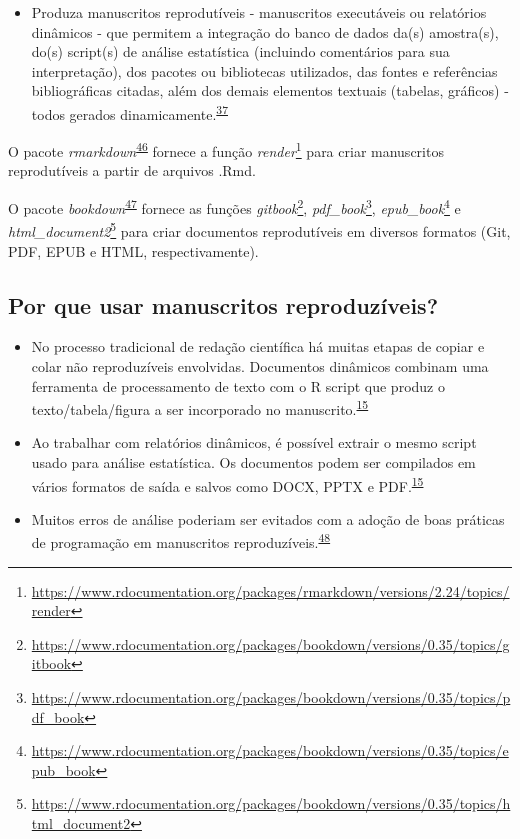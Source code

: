 \documentclass[
  a4paper,
]{book}
\providecommand{\tightlist}{%
  \setlength{\itemsep}{0pt}\setlength{\parskip}{0pt}}
\renewcommand{\href}[2]{#2\footnote{\url{#1}}}
\newenvironment{infobox}[1]
  {
  \begin{itemize}
  \renewcommand{\labelitemi}{
    \raisebox{-.7\height}[0pt][0pt]{
      {\setkeys{Gin}{width=3em,keepaspectratio}
        \texttt{[image: \#1]}}
    }
  }
  \setlength{\fboxsep}{1em}
  \begin{blackbox}
  \item
  }
  {
  \end{blackbox}
  \end{itemize}
  }
\begin{document}
\begin{itemize}
\tightlist
\item
  Produza manuscritos reprodutíveis - manuscritos executáveis ou relatórios dinâmicos - que permitem a integração do banco de dados da(s) amostra(s), do(s) script(s) de análise estatística (incluindo comentários para sua interpretação), dos pacotes ou bibliotecas utilizados, das fontes e referências bibliográficas citadas, além dos demais elementos textuais (tabelas, gráficos) - todos gerados dinamicamente.\textsuperscript{\protect\hyperlink{ref-hinsen2011}{37}}
\end{itemize}

\begin{infobox}{images/Rlogo}
O pacote \emph{rmarkdown}\textsuperscript{\protect\hyperlink{ref-rmarkdown}{46}} fornece a função \href{https://www.rdocumentation.org/packages/rmarkdown/versions/2.24/topics/render}{\emph{render}} para criar manuscritos reprodutíveis a partir de arquivos .Rmd.

\end{infobox}

\begin{infobox}{images/Rlogo}
O pacote \emph{bookdown}\textsuperscript{\protect\hyperlink{ref-bookdown-2}{47}} fornece as funções \href{https://www.rdocumentation.org/packages/bookdown/versions/0.35/topics/gitbook}{\emph{gitbook}}, \href{https://www.rdocumentation.org/packages/bookdown/versions/0.35/topics/pdf_book}{\emph{pdf\_book}}, \href{https://www.rdocumentation.org/packages/bookdown/versions/0.35/topics/epub_book}{\emph{epub\_book}} e \href{https://www.rdocumentation.org/packages/bookdown/versions/0.35/topics/html_document2}{\emph{html\_document2}} para criar documentos reprodutíveis em diversos formatos (Git, PDF, EPUB e HTML, respectivamente).

\end{infobox}

\hypertarget{por-que-usar-manuscritos-reproduzuxedveis}{%
\subsection{Por que usar manuscritos reproduzíveis?}\label{por-que-usar-manuscritos-reproduzuxedveis}}

\begin{itemize}
\item
  No processo tradicional de redação científica há muitas etapas de copiar e colar não reproduzíveis envolvidas. Documentos dinâmicos combinam uma ferramenta de processamento de texto com o R script que produz o texto/tabela/figura a ser incorporado no manuscrito.\textsuperscript{\protect\hyperlink{ref-mair2016}{15}}
\item
  Ao trabalhar com relatórios dinâmicos, é possível extrair o mesmo script usado para análise estatística. Os documentos podem ser compilados em vários formatos de saída e salvos como DOCX, PPTX e PDF.\textsuperscript{\protect\hyperlink{ref-mair2016}{15}}
\item
  Muitos erros de análise poderiam ser evitados com a adoção de boas práticas de programação em manuscritos reproduzíveis.\textsuperscript{\protect\hyperlink{ref-trisovic2022}{48}}
\end{itemize}
\end{document}
